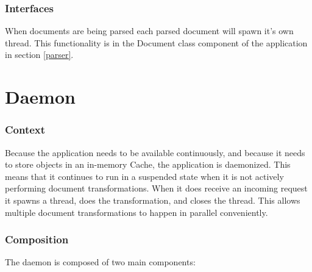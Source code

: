 \begin{enmerate}
\subsubsection{Interfaces}

When documents are being parsed each parsed document will spawn it's own thread.
This functionality is in the Document class component of the application in section \ref{parser}.

\section{Daemon}
\label{daemon}

\subsubsection{Context}

Because the application needs to be available continuously, and because it needs to store objects in an in-memory Cache, the application is daemonized.
This means that it continues to run in a suspended state when it is not actively performing document transformations.
When it does receive an incoming request it spawns a thread, does the transformation, and closes the thread.
This allows multiple document transformations to happen in parallel conveniently.

\subsubsection{Composition}

The daemon is composed of two main components:

\end{enmerate}
